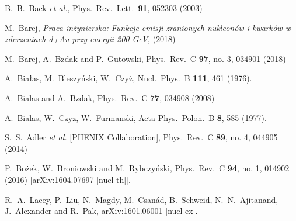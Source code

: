 \documentclass[a4paper,12pt]{article}
\begin{document}
\begin{thebibliography}{9}
  B.~B.~Back {\it et al.},
  Phys.\ Rev.\ Lett.\  {\bf 91}, 052303 (2003)

  M.~Barej, \textit{Praca inżynierska: Funkcje emisji zranionych nukleonów i kwarków w zderzeniach d+Au przy energii 200 GeV}, (2018)

  M.~Barej, A.~Bzdak and P.~Gutowski,
  Phys.\ Rev.\ C {\bf 97}, no. 3, 034901 (2018)

  A.~Białas, M.~Bleszyński, W.~Czyż,
  Nucl.\ Phys.\ B {\bf 111}, 461 (1976).

  A.~Bialas and A.~Bzdak,
  Phys.\ Rev.\ C {\bf 77}, 034908 (2008)

  A.~Bialas, W.~Czyz, W.~Furmanski,
  Acta Phys.\ Polon.\ B {\bf 8}, 585 (1977).

  S.~S.~Adler {\it et al.} [PHENIX Collaboration],
  Phys.\ Rev.\ C {\bf 89}, no. 4, 044905 (2014)

 P.~Bożek, W.~Broniowski and M.~Rybczyński,
  Phys.\ Rev.\ C {\bf 94}, no. 1, 014902 (2016)
  [arXiv:1604.07697 [nucl-th]].

 R.~A.~Lacey, P.~Liu, N.~Magdy, M.~Csanád, B.~Schweid, N.~N.~Ajitanand, J.~Alexander and R.~Pak,
  arXiv:1601.06001 [nucl-ex].


\end{thebibliography}
\end{document}
